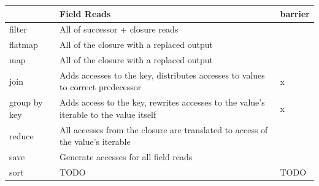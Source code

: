     \begin{tabularx}{0.5\textwidth}{l|X|l}
    
        ~            & Field Reads                                                                           & barrier \\ \hline
        filter       & All of successor + closure reads                                                      & ~       \\ 
        flatmap      & All of the closure with a replaced output                                             & ~       \\ 
        map          & All of the closure with a replaced output                                             & ~       \\ 
        join         & Adds accesses to the key, distributes accesses to values to correct predecessor       & x       \\ 
        group by key & Adds access to the key, rewrites accesses to the value's iterable to the value itself & x       \\ 
        reduce       & All accesses from the closure are translated to access of the value's iterable        & ~       \\ 
        save         & Generate accesses for all field reads                                                 & ~       \\ 
        sort         & TODO                                                                                  & TODO    \\ 


    \end{tabularx}
    \label{table:field_reduction}

